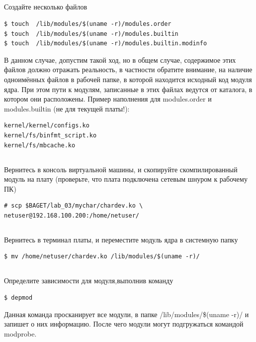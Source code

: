 \subsection{} Создайте несколько файлов
\begin{lstlisting}[style=bash]
$ touch  /lib/modules/$(uname -r)/modules.order
$ touch  /lib/modules/$(uname -r)/modules.builtin
$ touch  /lib/modules/$(uname -r)/modules.builtin.modinfo
\end{lstlisting}
В данном случае, допустим такой ход, но в общем случае, содержимое этих файлов должно отражать реальность, в частности обратите внимание, на наличие одноимённых файлов в рабочей папке, в которой находится исходный код модуля ядра. 
При этом пути к модулям, записанные в этих файлах ведутся от каталога, в котором они расположены.
Пример наполнения для modules.order и modules.builtin (не для текущей платы!):
\begin{lstlisting}[style=stdout]
kernel/kernel/configs.ko
kernel/fs/binfmt_script.ko
kernel/fs/mbcache.ko
\end{lstlisting}

\subsection{} Вернитесь в консоль виртуальной машины, и скопируйте скомпилированный модуль на плату (проверьте, что плата подключена сетевым шнуром к рабочему ПК)
\begin{lstlisting}[style=bash]
# scp $BAGET/lab_03/mychar/chardev.ko \
netuser@192.168.100.200:/home/netuser/
\end{lstlisting}


\subsection{} Вернитесь в терминал платы, и переместите модуль ядра в системную папку
\begin{lstlisting}[style=bash]
$ mv /home/netuser/chardev.ko /lib/modules/$(uname -r)/
\end{lstlisting}

\subsection{} Определите зависимости для модуля,выполнив команду 
\begin{lstlisting}[style=bash]
$ depmod
\end{lstlisting}
Данная команда просканирует все модули, в папке /lib/modules/\$(uname -r)/ и запишет о них информацию. После чего модули могут подгружаться командой modprobe. 

